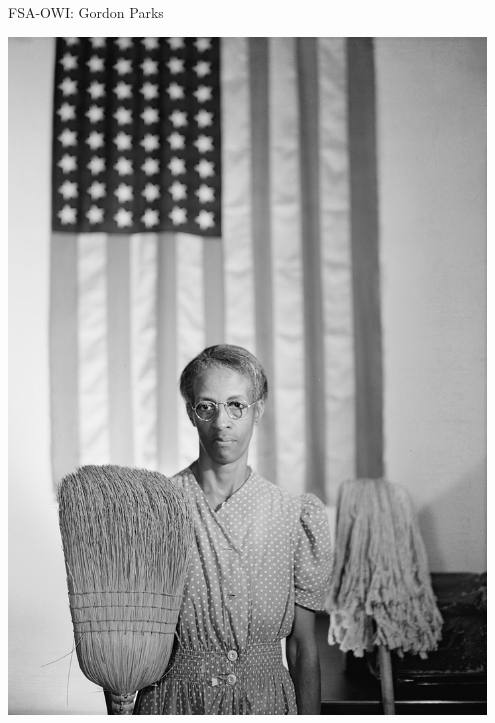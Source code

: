 \documentclass[12pt,ignorenonframetext,aspectratio=169]{beamer}
\begin{document}
\begin{frame}{FSA-OWI: Gordon Parks}

\begin{center}
\includegraphics[width=0.95\textwidth]{img/1024px-Gordon_Parks_-_American_Gothic.jpg}
\end{center}

\end{frame}
\end{document}
